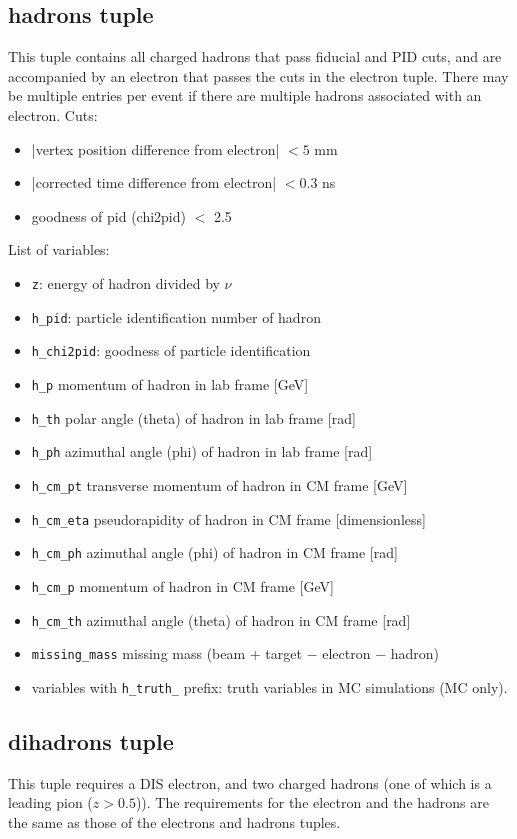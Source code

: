\documentclass[english]{article}
\newcommand{\code}[1]{\texttt{#1}}
\begin{document}
\subsection{hadrons tuple} 
This tuple contains all charged hadrons that pass fiducial and PID cuts, and are accompanied by an electron that passes the cuts in the electron tuple.  There may be multiple entries per event if there are multiple hadrons associated with an electron.  
Cuts:
\begin{itemize}
\item |vertex position difference from electron| $<5$ mm
\item |corrected time difference from electron| $<0.3$ ns
\item goodness of pid (chi2pid) $<$ 2.5

\end{itemize}
List of variables:
\begin{itemize}
\item \code{z}:  energy of hadron divided by $\nu$
\item \code{h\_pid}:  particle identification number of hadron \cite{pdgcodes}
\item \code{h\_chi2pid}:  goodness of particle identification
\item \code{h\_p} momentum of hadron in lab frame [GeV]
\item \code{h\_th} polar angle (theta) of hadron in lab frame [rad]
\item \code{h\_ph} azimuthal angle (phi) of hadron in lab frame [rad]
\item \code{h\_cm\_pt} transverse momentum of hadron in CM frame [GeV]
\item \code{h\_cm\_eta} pseudorapidity of hadron in CM frame [dimensionless]
\item \code{h\_cm\_ph} azimuthal angle (phi) of hadron in CM frame [rad]
\item \code{h\_cm\_p}  momentum of hadron in CM frame [GeV]
\item \code{h\_cm\_th} azimuthal angle (theta) of hadron in CM frame [rad]
\item \code{missing\_mass} missing mass (beam + target $-$ electron $-$ hadron)
\item variables with \code{h\_truth\_} prefix: truth variables in MC simulations (MC only).  
\end{itemize}


\subsection{dihadrons tuple} 
This tuple requires a DIS electron, and two charged hadrons (one of which is a leading pion ($z>0.5$)).  The requirements for the electron and the hadrons are the same as those of the electrons and hadrons tuples.
\end{document}
